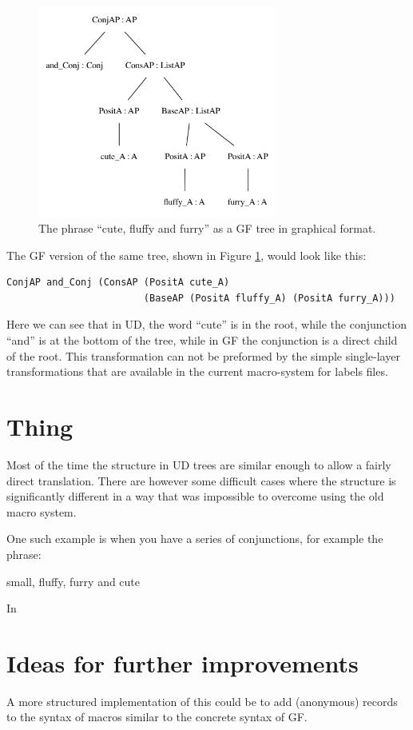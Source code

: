 \begin{figure}
    \centering
    \includegraphics[width=0.7\textwidth]{figure/cute_gf.png}
    \caption{The phrase ``cute, fluffy and furry'' as a GF tree in graphical format. }
    \label{fig:gf_cute}
\end{figure}

The GF version of the same tree, shown in Figure \ref{fig:gf_cute}, would look like this:

\begin{verbatim}
ConjAP and_Conj (ConsAP (PositA cute_A)
                        (BaseAP (PositA fluffy_A) (PositA furry_A)))
\end{verbatim}
Here we can see that in UD, the word ``cute'' is in the root, while the conjunction ``and'' is at the bottom of the tree, while in GF the conjunction is a direct child of the root. This transformation can not be preformed by the simple single-layer transformations that are available in the current macro-system for labels files.



\section{Thing}

Most of the time the structure in UD trees are similar enough to allow a fairly direct translation.
There are however some difficult cases where the structure is significantly different in a way that was impossible to overcome using the old macro system.

One such example is when you have a series of conjunctions, for example the phrase:

  small, fluffy, furry and cute

In 

\section{Ideas for further improvements}

A more structured implementation of this could be to add (anonymous) records to the syntax of macros similar to the concrete syntax of GF. 